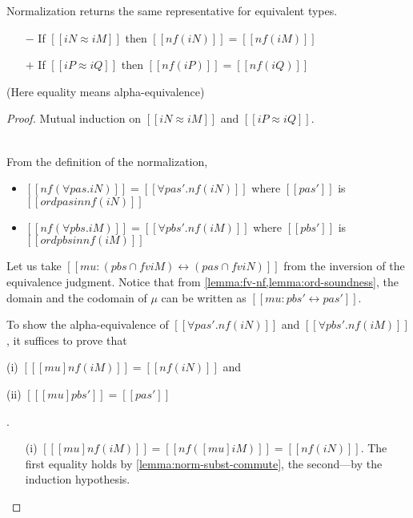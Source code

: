 \begin{lemma}
  \label{lemma:normalization-completeness}
  Normalization returns the same representative for equivalent types.

  \begin{itemize}
  \item[$-$] If $[[iN ≈ iM]]$ then $[[nf(iN)]] = [[nf(iM)]]$
  \item[$+$] If $[[iP ≈ iQ]]$ then $[[nf(iP)]] = [[nf(iQ)]]$
  \end{itemize}
  (Here equality means alpha-equivalence)
\end{lemma}

\begin{proof}
  Mutual induction on $[[iN ≈ iM]]$ and $[[iP ≈ iQ]]$.
  \begin{caseof}
  \item {\nameref{\ottdruleEOneForallLabel}} \label{case:ord-completeness:forall} \\

    From the definition of the normalization,
    \begin{itemize}
      \item $[[nf(∀pas.iN)]] = [[∀pas'.nf(iN)]]$ where $[[pas']]$ is $[[ord {pas} in nf(iN)]]$
      \item $[[nf(∀pbs.iM)]] = [[∀pbs'.nf(iM)]]$ where $[[pbs']]$ is $[[ord {pbs} in nf(iM)]]$
    \end{itemize}
    Let us take $[[mu : ({pbs} ∩ fv iM) ↔ ({pas} ∩ fv iN)]]$ from the
    inversion of the equivalence judgment. Notice that from
    \cref{lemma:fv-nf,lemma:ord-soundness}, the domain and the codomain of $\mu$ can be written
    as $[[mu : {pbs'} ↔ {pas'}]]$.
    
    To show the alpha-equivalence of $[[∀pas'.nf(iN)]]$ and $[[∀pbs'.nf(iM)]]$,
    it suffices to prove that
    \begin{enumerate*}
    \item[(i)] $[[ [mu] nf(iM) ]] = [[nf(iN)]]$ and \newline
    \item[(ii)] $[[ [mu]pbs' ]] = [[pas']]$
    \end{enumerate*}.
    
    \begin{enumerate}
    \item[(i)] $[[ [mu] nf(iM) ]] = [[nf([mu]iM)]] = [[nf(iN)]]$.
      The first equality holds by \cref{lemma:norm-subst-commute}, the second---by the induction hypothesis.


\end{enumerate}
\end{caseof}
\end{proof}
